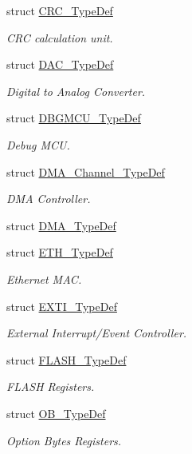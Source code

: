 \begin{DoxyCompactItemize}
struct \hyperlink{struct_c_r_c___type_def}{C\-R\-C\-\_\-\-Type\-Def}
\begin{DoxyCompactList}\small\item\em C\-R\-C calculation unit. \end{DoxyCompactList}\item 
struct \hyperlink{struct_d_a_c___type_def}{D\-A\-C\-\_\-\-Type\-Def}
\begin{DoxyCompactList}\small\item\em Digital to Analog Converter. \end{DoxyCompactList}\item 
struct \hyperlink{struct_d_b_g_m_c_u___type_def}{D\-B\-G\-M\-C\-U\-\_\-\-Type\-Def}
\begin{DoxyCompactList}\small\item\em Debug M\-C\-U. \end{DoxyCompactList}\item 
struct \hyperlink{struct_d_m_a___channel___type_def}{D\-M\-A\-\_\-\-Channel\-\_\-\-Type\-Def}
\begin{DoxyCompactList}\small\item\em D\-M\-A Controller. \end{DoxyCompactList}\item 
struct \hyperlink{struct_d_m_a___type_def}{D\-M\-A\-\_\-\-Type\-Def}
\item 
struct \hyperlink{struct_e_t_h___type_def}{E\-T\-H\-\_\-\-Type\-Def}
\begin{DoxyCompactList}\small\item\em Ethernet M\-A\-C. \end{DoxyCompactList}\item 
struct \hyperlink{struct_e_x_t_i___type_def}{E\-X\-T\-I\-\_\-\-Type\-Def}
\begin{DoxyCompactList}\small\item\em External Interrupt/\-Event Controller. \end{DoxyCompactList}\item 
struct \hyperlink{struct_f_l_a_s_h___type_def}{F\-L\-A\-S\-H\-\_\-\-Type\-Def}
\begin{DoxyCompactList}\small\item\em F\-L\-A\-S\-H Registers. \end{DoxyCompactList}\item 
struct \hyperlink{struct_o_b___type_def}{O\-B\-\_\-\-Type\-Def}
\begin{DoxyCompactList}\small\item\em Option Bytes Registers. \end{DoxyCompactList}\item 

\end{DoxyCompactItemize}
